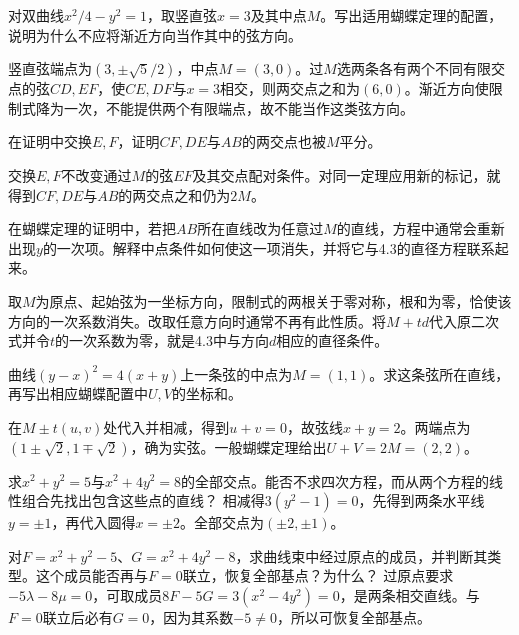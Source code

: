 对双曲线\(x^2/4-y^2=1\)，取竖直弦\(x=3\)及其中点\(M\)。写出适用蝴蝶定理的配置，说明为什么不应将渐近方向当作其中的弦方向。
\par
\solutionanswer
竖直弦端点为\((3,\pm\sqrt5/2)\)，中点\(M=(3,0)\)。过\(M\)选两条各有两个不同有限交点的弦\(CD,EF\)，使\(CE,DF\)与\(x=3\)相交，则两交点之和为\((6,0)\)。渐近方向使限制式降为一次，不能提供两个有限端点，故不能当作这类弦方向。


在证明中交换\(E,F\)，证明\(CF,DE\)与\(AB\)的两交点也被\(M\)平分。
\par
\solutionanswer
交换\(E,F\)不改变通过\(M\)的弦\(EF\)及其交点配对条件。对同一定理应用新的标记，就得到\(CF,DE\)与\(AB\)的两交点之和仍为\(2M\)。


在蝴蝶定理的证明中，若把\(AB\)所在直线改为任意过\(M\)的直线，方程中通常会重新出现\(y\)的一次项。解释中点条件如何使这一项消失，并将它与4.3的直径方程联系起来。
\par
\solutionanswer
取\(M\)为原点、起始弦为一坐标方向，限制式的两根关于零对称，根和为零，恰使该方向的一次系数消失。改取任意方向时通常不再有此性质。将\(M+td\)代入原二次式并令\(t\)的一次系数为零，就是4.3中与方向\(d\)相应的直径条件。


曲线\((y-x)^2=4(x+y)\)上一条弦的中点为\(M=(1,1)\)。求这条弦所在直线，再写出相应蝴蝶配置中\(U,V\)的坐标和。
\par
\solutionanswer
在\(M\pm t(u,v)\)处代入并相减，得到\(u+v=0\)，故弦线\(x+y=2\)。两端点为\((1\pm\sqrt2,1\mp\sqrt2)\)，确为实弦。一般蝴蝶定理给出\(U+V=2M=(2,2)\)。


求\(x^2+y^2=5\)与\(x^2+4y^2=8\)的全部交点。能否不求四次方程，而从两个方程的线性组合先找出包含这些点的直线？
\solutionanswer
相减得\(3(y^2-1)=0\)，先得到两条水平线\(y=\pm1\)，再代入圆得\(x=\pm2\)。全部交点为\((\pm2,\pm1)\)。


对\(F=x^2+y^2-5\)、\(G=x^2+4y^2-8\)，求曲线束中经过原点的成员，并判断其类型。这个成员能否再与\(F=0\)联立，恢复全部基点？为什么？
\solutionanswer
过原点要求\(-5\lambda-8\mu=0\)，可取成员\(8F-5G=3(x^2-4y^2)=0\)，是两条相交直线。与\(F=0\)联立后必有\(G=0\)，因为其系数\(-5\ne0\)，所以可恢复全部基点。


